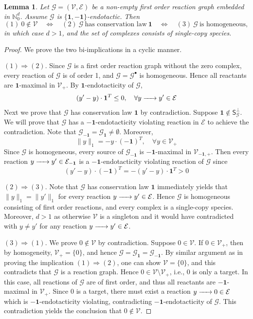 \documentclass[10pt]{amsart}
\numberwithin{equation}{section}
\theoremstyle{plain}
\newtheorem{lemma}[theorem]{Lemma}
\theoremstyle{definition}
\theoremstyle{remark}
\newcommand{\cE}{\mathcal{E}}
\newcommand{\cG}{\mathcal{G}}
\newcommand{\cV}{\mathcal{V}}
\begin{document}
\begin{lemma}\label{le:homogeneity}
Let $\cG=(\cV,\cE)$ be a non-empty first order reaction graph embedded in $\mathbb{N}^d_0$. Assume $\cG$ is
$\{\mathbf{1},-\mathbf{1}\}$-endotactic. Then $$(1)\ 0\notin\cV\quad \Leftrightarrow\quad (2)\ \cG\ \text{has conservation law}\ \mathbf{1}\quad \Leftrightarrow\quad (3)\ \cG\ \text{is homogeneous},$$ in which case $d>1$, and the set of complexes consists of single-copy species.
\end{lemma}
\begin{proof}
We prove the two bi-implications in a cyclic manner.
\medskip

\noindent $(1)\Rightarrow(2)$. Since $\cG$ is a first order reaction graph without 
the zero complex, every reaction of $\cG$ is of order 1,  and $\cG=\cG^{\bullet}$ is homogeneous. Hence all reactants are $\mathbf{1}$-maximal in $\cV_+$. By $\mathbf{1}$-endotacticity of $\cG$, $$(y'-y)\cdot\mathbf{1}^T\le0,\quad \forall y\ce{->[]} y'\in\cE$$ Next we prove that $\cG$ has conservation law $\mathbf{1}$ by contradiction. Suppose $\mathbf{1}\notin\mathsf{S}_{\cG}^{\perp}$. We will prove that $\cG$ has a $-\mathbf{1}$-endotacticity violating reaction in $\cE$ to achieve the contradiction. Note that $\cG_{-\mathbf{1}}=\cG_{\mathbf{1}}\neq\emptyset$. Moreover, $$\|y\|_1=-y\cdot (-\mathbf{1})^T,\quad \forall y\in\cV_+$$  
Since $\cG$ is homogeneous, every source of $\cG_{-\mathbf{1}}$ is $-\mathbf{1}$-maximal in $\cV_{-\mathbf{1},+}$.
Then every reaction $y\ce{->[]} y'\in\cE_{-\mathbf{1}}$ is a $-\mathbf{1}$-endotacticity violating reaction of $\cG$ since \[(y'-y)\cdot (-\mathbf{1})^T=-(y'-y)\cdot\mathbf{1}^T>0\]


\noindent $(2)\Rightarrow(3)$. Note that $\cG$ has conservation law $\mathbf{1}$ immediately yields that $\|y\|_1=\|y'\|_1$ for every reaction $y\ce{->} y'\in\cE$. Hence $\cG$ is homogeneous consisting of first order reactions, and every complex is a single-copy species. Moreover, $d>1$ as otherwise $\cV$ is a singleton and it would have contradicted with $y\neq y'$ for any reaction $y\ce{->}y'\in\cE$.
\medskip

\noindent $(3)\Rightarrow(1)$. We prove $0\notin\cV$  by contradiction. Suppose $0\in\cV$. If $0\in\cV_+$, then   by homogeneity, $\cV_+=\{0\}$, and hence $\cG=\cG_{\mathbf{1}}=\cG_{-\mathbf{1}}$. By similar argument as in proving the implication $(1)\Rightarrow(2)$, one can show $\cV=\{0\}$, and this contradicts that $\cG$ is a reaction graph. Hence $0\in\cV\setminus\cV_+$,
i.e., $0$ is only a target. In this case, all reactions of $\cG$ are of first order, and thus all reactants are $-\mathbf{1}$-maximal in $\cV_+$. Since $0$ is a target, there must exist a reaction $y\ce{->}0\in\cE$ which is $-\mathbf{1}$-endotacticity violating, contradicting $-\mathbf{1}$-endotacticity of $\cG$. This contradiction yields the conclusion that $0\notin\cV$.
\end{proof}
\end{document}
